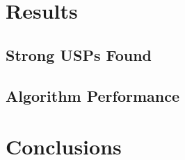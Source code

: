 \documentclass[11pt]{article}
\begin{document}
\section{Results}
\label{sec:results}

\subsection{Strong USPs Found}
\label{subsec:usps_found}

\subsection{Algorithm Performance}
\label{subsec:performance}

\section{Conclusions}
\label{sec:conclusion}

 

\appendix
\end{document}
